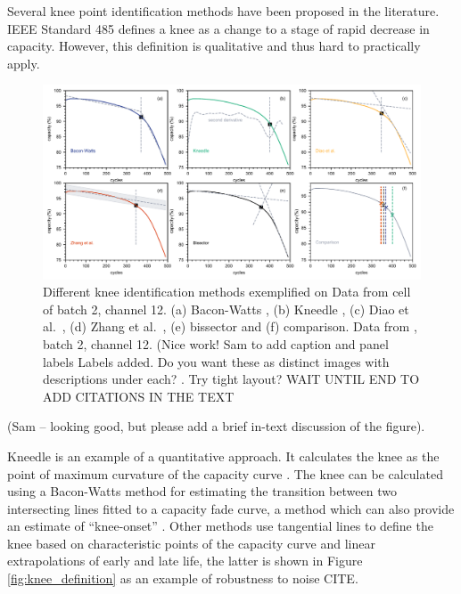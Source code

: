 \documentclass{article}
\newcommand{\cmark}{\textcolor{blue}{\textrm{\ding{52}}}}%
\begin{document}
Several knee point identification methods have been proposed in the literature. IEEE Standard 485  \cite{noauthor_ieee_2011} defines a knee as a change to a stage of rapid decrease in capacity. However, this definition is qualitative and thus hard to practically apply.

\begin{figure}[ht]
\centering
\includegraphics[width=\textwidth]{images/knee_identification_methods.pdf}
\caption{Different knee identification methods exemplified on Data from \cite{severson_data-driven_2019} cell of batch 2, channel 12. (a) Bacon-Watts \cite{fermin-cueto_identification_2020}, (b) Kneedle \cite{satopaa_finding_2011}, (c) Diao et al.~\cite{diao_algorithm_2019}, (d) Zhang et al.~\cite{zhang_identifying_2020}, (e) bissector and (f) comparison. 
{\color{blue} Data from \cite{severson_data-driven_2019}, batch 2, channel 12.} (Nice work! Sam to add caption and panel labels {\color{green} Labels added. Do you want these as distinct images with descriptions under each? }. Try tight layout? 
WAIT UNTIL END TO ADD CITATIONS IN THE TEXT}
\label{fig:knee_identification_methods}
\end{figure}


(Sam -- looking good, but please add a brief in-text discussion of the figure).


Kneedle is an example of a quantitative approach. It calculates the knee as the point of maximum curvature of the capacity curve \cite{satopaa_finding_2011}. The knee can be calculated using a Bacon-Watts method for estimating the transition between two intersecting lines fitted to a capacity fade curve, a method which can also provide an estimate of ``knee-onset'' \cite{fermin-cueto_identification_2020}. Other methods use tangential lines to define the knee based on characteristic points of the capacity curve \cite{diao_algorithm_2019} and linear extrapolations of early and late life, the latter is shown in Figure \ref{fig:knee_definition} as an example of robustness to noise CITE.
\end{document}
